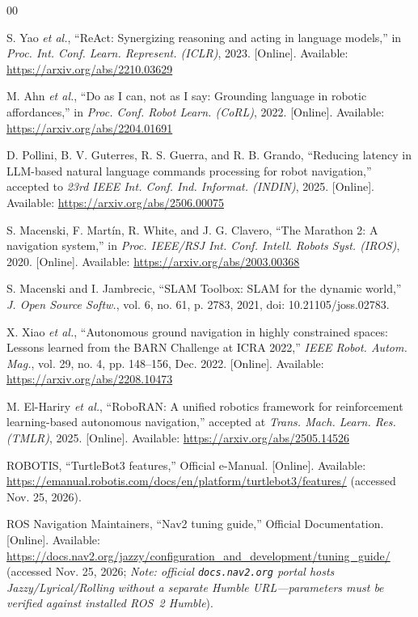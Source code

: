 \documentclass[conference,a4paper]{IEEEtran}
\begin{document}
\begin{thebibliography}{00}

 S. Yao \textit{et al.}, ``ReAct: Synergizing reasoning and acting in language models,'' in \textit{Proc. Int. Conf. Learn. Represent. (ICLR)}, 2023. [Online]. Available: \url{https://arxiv.org/abs/2210.03629}

 M. Ahn \textit{et al.}, ``Do as I can, not as I say: Grounding language in robotic affordances,'' in \textit{Proc. Conf. Robot Learn. (CoRL)}, 2022. [Online]. Available: \url{https://arxiv.org/abs/2204.01691}

 D. Pollini, B. V. Guterres, R. S. Guerra, and R. B. Grando, ``Reducing latency in LLM-based natural language commands processing for robot navigation,'' accepted to \textit{23rd IEEE Int. Conf. Ind. Informat. (INDIN)}, 2025. [Online]. Available: \url{https://arxiv.org/abs/2506.00075}

 S. Macenski, F. Mart\'{i}n, R. White, and J. G. Clavero, ``The Marathon 2: A navigation system,'' in \textit{Proc. IEEE/RSJ Int. Conf. Intell. Robots Syst. (IROS)}, 2020. [Online]. Available: \url{https://arxiv.org/abs/2003.00368}

 S. Macenski and I. Jambrecic, ``SLAM Toolbox: SLAM for the dynamic world,'' \textit{J. Open Source Softw.}, vol. 6, no. 61, p. 2783, 2021, doi: 10.21105/joss.02783.

 X. Xiao \textit{et al.}, ``Autonomous ground navigation in highly constrained spaces: Lessons learned from the BARN Challenge at ICRA 2022,'' \textit{IEEE Robot. Autom. Mag.}, vol. 29, no. 4, pp. 148--156, Dec. 2022. [Online]. Available: \url{https://arxiv.org/abs/2208.10473}

 M. El-Hariry \textit{et al.}, ``RoboRAN: A unified robotics framework for reinforcement learning-based autonomous navigation,'' accepted at \textit{Trans. Mach. Learn. Res. (TMLR)}, 2025. [Online]. Available: \url{https://arxiv.org/abs/2505.14526}

 ROBOTIS, ``TurtleBot3 features,'' Official e-Manual. [Online]. Available: \url{https://emanual.robotis.com/docs/en/platform/turtlebot3/features/} (accessed Nov. 25, 2026).

 ROS Navigation Maintainers, ``Nav2 tuning guide,'' Official Documentation. [Online]. Available: \url{https://docs.nav2.org/jazzy/configuration_and_development/tuning_guide/} (accessed Nov. 25, 2026; \textit{Note: official \texttt{docs.nav2.org} portal hosts Jazzy/Lyrical/Rolling without a separate Humble URL---parameters must be verified against installed ROS~2 Humble}).


\end{thebibliography}
\end{document}

